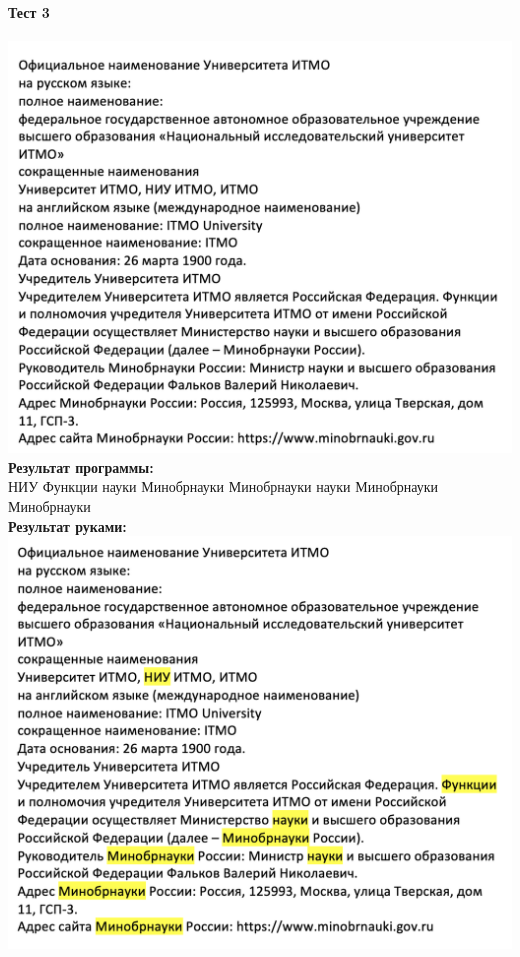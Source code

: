 \documentclass[12pt,onecolumn]{article}
\begin{document}
\begin{flushleft}
\paragraph{Тест 3}
\hfill \break
\includegraphics[scale=0.4]{prog2/p3.png}\\
\textbf{Результат программы:}\\
НИУ Функции науки Минобрнауки Минобрнауки науки Минобрнауки Минобрнауки\\
\textbf{Результат руками:}\\
\includegraphics[scale=0.4]{prog2/p3+.png}\\

\end{flushleft}
\end{document}

